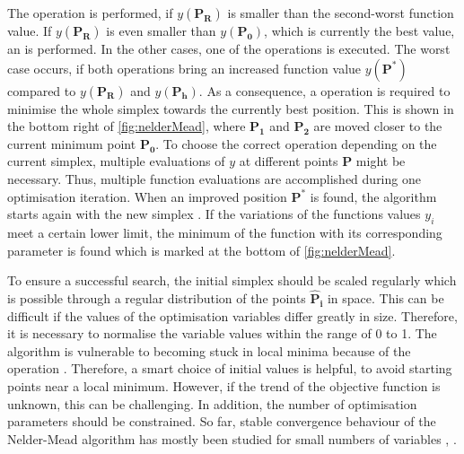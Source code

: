 The operation  is performed, if $y(\mathbf{P_R})$ is smaller than the second-worst function value. If $y(\mathbf{P_R})$ is even smaller than $y(\mathbf{P_0})$, which is currently the best value, an  is performed. In the other cases, one of the  operations is executed. The worst case occurs, if both  operations bring an increased function value $y(\mathbf{P^*})$ compared to $y(\mathbf{P_R})$ and $y(\mathbf{P_h})$. As a consequence, a  operation is required to minimise the whole simplex towards the currently best position. This is shown in the bottom right of \autoref{fig:nelderMead}, where $\mathbf{P_1}$ and $\mathbf{P_2}$ are moved closer to the current minimum point $\mathbf{P_0}$. To choose the correct operation depending on the current simplex, multiple evaluations of $y$ at different points $\mathbf{P}$ might be necessary. Thus, multiple function evaluations are accomplished during one optimisation iteration. When an improved position $\mathbf{P^{*}}$ is found, the algorithm starts again with the new simplex \cite{nelder_simplex_1965}. If the variations of the functions values $y_i$ meet a certain lower limit, the minimum of the function with its corresponding parameter is found which is marked at the bottom of \autoref{fig:nelderMead}.

To ensure a successful search, the initial simplex should be scaled regularly \cite{baudin_nelder-mead_nodate} which is possible through a regular distribution of the points $\mathbf{\hat{P}_i}$ in space. This can be difficult if the values of the optimisation variables differ greatly in size. Therefore, it is necessary to normalise the variable values within the range of 0 to 1. The algorithm is vulnerable to becoming stuck in local minima because of the  operation \cite{luersen_globalized_2004}. Therefore, a smart choice of initial values is helpful, to avoid starting points near a local minimum. However, if the trend of the objective function is unknown, this can be challenging. In addition, the number of optimisation parameters should be constrained. So far, stable convergence behaviour of the Nelder-Mead algorithm has mostly been studied for small numbers of variables \cite{singer_efficient_2004}, \cite{pham_comparative_2011}.



